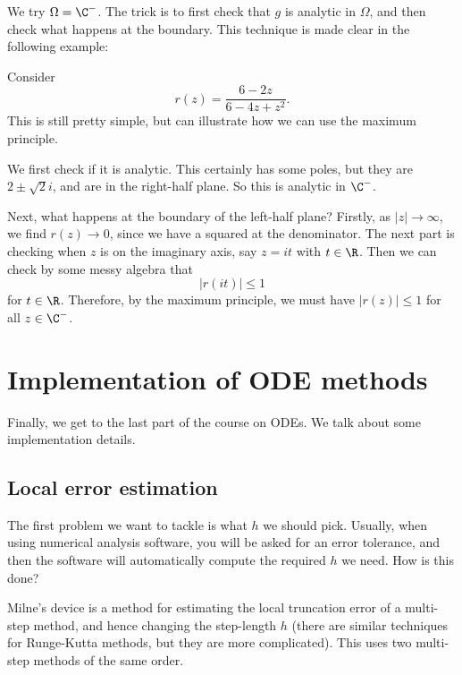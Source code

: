 \documentclass[a4paper]{article}
\begin{document}
We try $\Omega = \C^-$. The trick is to first check that $g$ is analytic in $\Omega$, and then check what happens at the boundary. This technique is made clear in the following example:

\begin{eg}
  Consider
  \[
    r(z) = \frac{6 - 2z}{6 - 4z + z^2}.
  \]
  This is still pretty simple, but can illustrate how we can use the maximum principle.

  We first check if it is analytic. This certainly has some poles, but they are $2 \pm \sqrt{2} i$, and are in the right-half plane. So this is analytic in $\C^-$.

  Next, what happens at the boundary of the left-half plane? Firstly, as $|z| \to \infty$, we find $r(z) \to 0$, since we have a squared at the denominator. The next part is checking when $z$ is on the imaginary axis, say $z = it$ with $t \in \R$. Then we can check by some messy algebra that
  \[
    |r(it)| \leq 1
  \]
  for $t \in \R$. Therefore, by the maximum principle, we must have $|r(z)| \leq 1$ for all $z \in \C^-$.
\end{eg}

\section{Implementation of ODE methods}
Finally, we get to the last part of the course on ODEs. We talk about some implementation details.

\subsection{Local error estimation}
The first problem we want to tackle is what $h$ we should pick. Usually, when using numerical analysis software, you will be asked for an error tolerance, and then the software will automatically compute the required $h$ we need. How is this done?

Milne's device is a method for estimating the local truncation error of a multi-step method, and hence changing the step-length $h$ (there are similar techniques for Runge-Kutta methods, but they are more complicated). This uses two multi-step methods of the same order.
\end{document}
